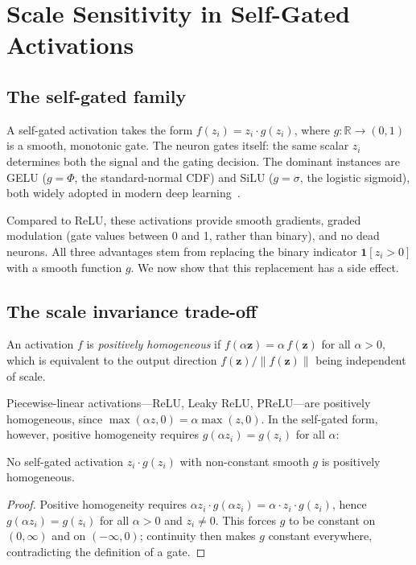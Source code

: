 \section{Scale Sensitivity in Self-Gated Activations}\label{sec:problem}

\subsection{The self-gated family}\label{sec:selfgated}

A self-gated activation takes the form $f(z_i) = z_i \cdot g(z_i)$, where $g: \mathbb{R} \to (0,1)$ is a smooth, monotonic gate.
The neuron gates itself: the same scalar $z_i$ determines both the signal and the gating decision.
The dominant instances are GELU ($g = \Phi$, the standard-normal CDF) and SiLU ($g = \sigma$, the logistic sigmoid), both widely adopted in modern deep learning~\citep{devlin2019bert,dosovitskiy2021image,brown2020language}.

Compared to ReLU, these activations provide smooth gradients, graded modulation (gate values between 0 and 1, rather than binary), and no dead neurons.
All three advantages stem from replacing the binary indicator $\mathbf{1}[z_i > 0]$ with a smooth function $g$.
We now show that this replacement has a side effect.

\subsection{The scale invariance trade-off}\label{sec:tradeoff}

An activation $f$ is \emph{positively homogeneous} if $f(\alpha\mathbf{z}) = \alpha\,f(\mathbf{z})$ for all $\alpha > 0$, which is equivalent to the output direction $f(\mathbf{z})/\|f(\mathbf{z})\|$ being independent of scale.

Piecewise-linear activations---ReLU, Leaky ReLU, PReLU---are positively homogeneous, since $\max(\alpha z, 0) = \alpha\max(z, 0)$.
In the self-gated form, however, positive homogeneity requires $g(\alpha z_i) = g(z_i)$ for all $\alpha$:

\begin{proposition}\label{prop:no_invariance}
No self-gated activation $z_i \cdot g(z_i)$ with non-constant smooth $g$ is positively homogeneous.
\end{proposition}
\begin{proof}
Positive homogeneity requires $\alpha z_i \cdot g(\alpha z_i) = \alpha \cdot z_i \cdot g(z_i)$, hence $g(\alpha z_i) = g(z_i)$ for all $\alpha > 0$ and $z_i \neq 0$.
This forces $g$ to be constant on $(0,\infty)$ and on $(-\infty, 0)$; continuity then makes $g$ constant everywhere, contradicting the definition of a gate.
\end{proof}

